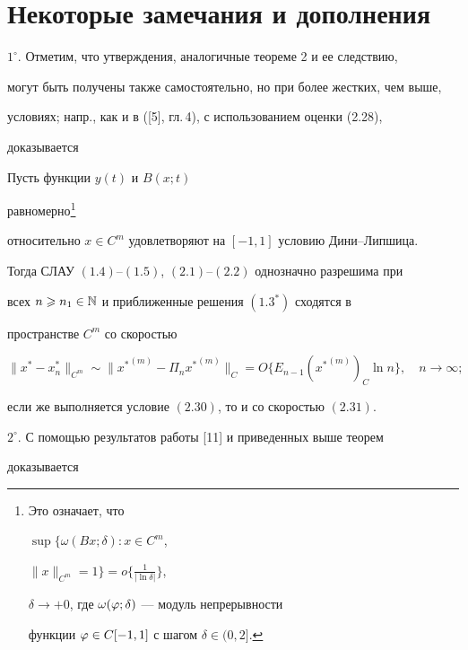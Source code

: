 \section{Некоторые замечания и дополнения}





$1^\circ$. Отметим, что утверждения, аналогичные теореме 2 и ее следствию, 


могут быть получены также самостоятельно, но при более жестких, чем выше, 


условиях; напр., как и в ([5], гл.\,4), с использованием оценки (2.28),


доказывается





\begin{thm}


Пусть функции $y(t)$ и $B(x;t)$


равномерно\footnote{Это означает, что


$\sup\limits\{\omega(Bx;\delta):x\in C^m$,


$\|x\|_{C^m} = 1\} = o\big\{\frac{1}{|\ln \delta|}\big\}$,


$\delta \to +0$, где $\omega(\varphi;\delta)$ --- модуль не\-пре\-рыв\-ности 


функции $\varphi\in C[-1,1]$ с шагом $\delta\in (0,2]$.}


относительно $x\in C^m$ удовлетворяют на $[-1,1]$ условию Дини--Липшица.


Тогда СЛАУ $(1.4)$--$(1.5)$, $(2.1)$--$(2.2)$ однозначно разрешима при 


всех $n\geqslant n_1 \in \Bbb{N}$ и приближенные решения $(1.3{}^*)$ сходятся в 


пространстве $C^m$ со скоростью


$$


\|x^* - x^*_n\|_{C^m} \sim \|{x^*}^{(m)} - \Pi_n {x^*}^{(m)}\|_C =


O\{E_{n-1}({x^*}^{(m)})_C \ln n\},\quad n\to \infty;


$$


если же выполняется условие $(2.30)$, то и со скоростью $(2.31)$.


\end{thm}





$2^\circ$. С помощью результатов работы [11] и приведенных выше теорем 


доказывается





